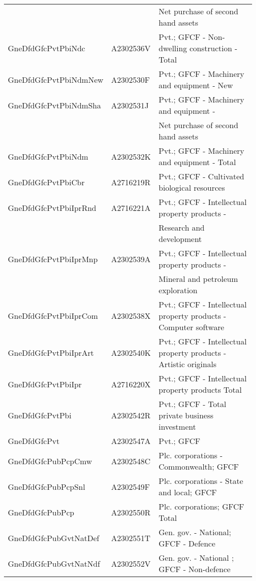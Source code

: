{\begin{table}
\begin{tabular*}{\columnwidth}[width = \textwidth]{lll}
                          &           & Net purchase of second hand \vphantom{1} assets\\
		\addlinespace
    GneDfdGfcPvtPbiNdc    & A2302536V & Pvt.; GFCF - Non-dwelling construction - Total\\
    GneDfdGfcPvtPbiNdmNew & A2302530F & Pvt.; GFCF - Machinery and equipment - New\\
    GneDfdGfcPvtPbiNdmSha & A2302531J & Pvt.; GFCF - Machinery and equipment -\\
                          &           & Net purchase of second hand assets\\
    GneDfdGfcPvtPbiNdm    & A2302532K & Pvt.; GFCF - Machinery and equipment - Total\\
		\addlinespace
    GneDfdGfcPvtPbiCbr    & A2716219R & Pvt.; GFCF - Cultivated biological resources\\
    GneDfdGfcPvtPbiIprRnd & A2716221A & Pvt.; GFCF - Intellectual property products -\\
                          &           & Research and development\\
    GneDfdGfcPvtPbiIprMnp & A2302539A & Pvt.; GFCF - Intellectual property products -\\
                          &           & Mineral and petroleum exploration\\
		\addlinespace
    GneDfdGfcPvtPbiIprCom & A2302538X & Pvt.; GFCF - Intellectual property products - Computer software\\
    GneDfdGfcPvtPbiIprArt & A2302540K & Pvt.; GFCF - Intellectual property products - Artistic originals\\
    GneDfdGfcPvtPbiIpr    & A2716220X & Pvt.; GFCF - Intellectual property products Total\\
    GneDfdGfcPvtPbi       & A2302542R & Pvt.;  GFCF - Total private business investment\\
    GneDfdGfcPvt          & A2302547A & Pvt.; GFCF\\
		\addlinespace
    GneDfdGfcPubPcpCmw    & A2302548C & Plc. corporations - Commonwealth; GFCF\\
    GneDfdGfcPubPcpSnl    & A2302549F & Plc. corporations - State and local; GFCF\\
    GneDfdGfcPubPcp       & A2302550R & Plc. corporations; GFCF Total\\
    GneDfdGfcPubGvtNatDef & A2302551T & Gen. gov. - National; GFCF - Defence\\
    GneDfdGfcPubGvtNatNdf & A2302552V & Gen. gov. - National ; GFCF - Non-defence\\

\end{tabular*}
\end{table}}

